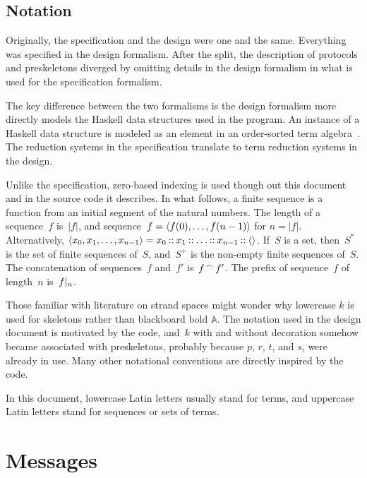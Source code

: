 \documentclass[12pt]{report}
\theoremstyle{definition}
\begin{document}
\section{Notation}\label{sec:notation}

Originally, the specification and the design were one and the same.
Everything was specified in the design formalism.  After the split,
the description of protocols and preskeletons diverged by omitting
details in the design formalism in what is used for the specification
formalism.

The key difference between the two formalisms is the design formalism
more directly models the Haskell data structures used in the {\cpsa}
program.  An instance of a Haskell data structure is modeled as an
element in an order-sorted term algebra~\cite{GoguenMeseguer92}.  The
reduction systems in the specification translate to term reduction
systems in the design.

Unlike the specification, zero-based indexing is used though out this
document and in the source code it describes.  In what follows, a
finite sequence is a function from an initial segment of the natural
numbers.  The length of a sequence~$f$ is~$|f|$, and
sequence~$f=\langle f(0),\ldots,f(n-1)\rangle$ for $n=|f|$.  Alternatively,
$\langle x_0,x_1,\ldots,x_{n-1}\rangle =x_0\mathbin{::} x_1\mathbin{::}\ldots\mathbin{::}
x_{n-1}\mathbin{::}\langle\rangle$.  If~$S$ is a set, then~$S^\ast$ is the set of
finite sequences of~$S$, and~$S^+$ is the non-empty finite sequences
of~$S$.  The concatenation of sequences~$f$ and~$f'$ is~$f\mathbin{{}^\smallfrown} f'$.
The prefix of sequence~$f$ of length~$n$ is~$f|_{n}$.

Those familiar with literature on strand spaces might wonder why
lowercase $k$ is used for skeletons rather than blackboard bold
$\mathbb{A}$.  The notation used in the design document is motivated
by the code, and~$k$ with and without decoration somehow became
associated with preskeletons, probably because $p$, $r$, $t$, and $s$,
were already in use.  Many other notational conventions are directly
inspired by the code.

In this document, lowercase Latin letters usually stand for terms, and
uppercase Latin letters stand for sequences or sets of terms.

\chapter{Messages}\label{cha:messages}
\end{document}
